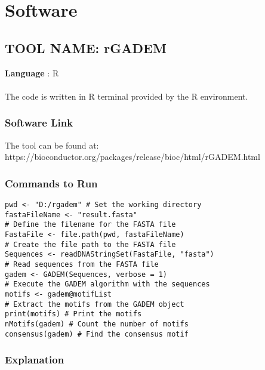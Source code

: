 \section{Software}

\subsection{TOOL NAME: rGADEM}
\vspace{8pt}
\textbf{Language} : R \\ \\
The code is written in R terminal provided by the R environment.

\subsubsection{Software Link}
The tool can be found at: https://bioconductor.org/packages/release/bioc/html/rGADEM.html

\subsubsection{Commands to Run}
\begin{verbatim}
pwd <- "D:/rgadem" # Set the working directory
fastaFileName <- "result.fasta" 
# Define the filename for the FASTA file
FastaFile <- file.path(pwd, fastaFileName) 
# Create the file path to the FASTA file
Sequences <- readDNAStringSet(FastaFile, "fasta") 
# Read sequences from the FASTA file
gadem <- GADEM(Sequences, verbose = 1) 
# Execute the GADEM algorithm with the sequences
motifs <- gadem@motifList 
# Extract the motifs from the GADEM object
print(motifs) # Print the motifs
nMotifs(gadem) # Count the number of motifs
consensus(gadem) # Find the consensus motif
\end{verbatim}


\subsubsection{Explanation}

